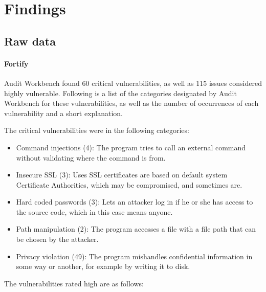 \documentclass{report} %
\begin{document}
  \newpage
  

\section{Findings}

\subsection{Raw data}

\paragraph{Fortify}

  Audit Workbench found 60 critical vulnerabilities, as well as 115 issues
  considered highly vulnerable. Following is a list of the categories designated
  by Audit Workbench for these vulnerabilities, as well as the number of
  occurrences of each vulnerability and a short explanation.

  The critical vulnerabilities were in the
  following categories:
  
  \begin{itemize}
  \item Command injections (4): The program tries to call an external command
    without validating where the command is from.
  \item Insecure SSL (3): Uses SSL certificates are based on default system
    Certificate Authorities, which may be compromised, and sometimes are.
  \item Hard coded passwords (3): Lets an attacker log in if he or she has access
    to the source code, which in this case means anyone.
  \item Path manipulation (2): The program accesses a file with a file path that
    can be chosen by the attacker.
  \item Privacy violation (49): The program mishandles confidential information
    in some way or another, for example by writing it to disk.
  \end{itemize}

  The vulnerabilities rated high are as follows:
\end{document}
